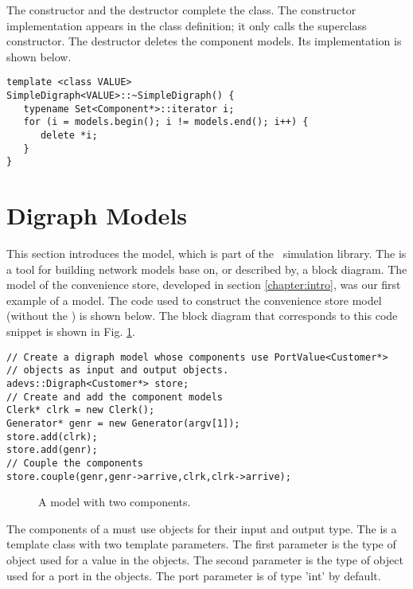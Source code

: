 The constructor and the destructor complete the class. The constructor implementation appears in the class definition; it only calls the superclass constructor. The destructor deletes the component models. Its implementation is shown below.
\begin{verbatim}
template <class VALUE>
SimpleDigraph<VALUE>::~SimpleDigraph() {
   typename Set<Component*>::iterator i;
   for (i = models.begin(); i != models.end(); i++) {
      delete *i;
   }
}
\end{verbatim}
 
\section{Digraph Models}
\label{section:digraph_models}
This section introduces the  model, which is part of the \adevs\ simulation library. The  is a tool for building network models base on, or described by, a block diagram. The model of the convenience store, developed in section \ref{chapter:intro}, was our first example of a  model. The code used to construct the convenience store model (without the ) is shown below. The block diagram that corresponds to this code snippet is shown in Fig. \ref{fig:two_component_diagram}.
\begin{verbatim}
// Create a digraph model whose components use PortValue<Customer*>
// objects as input and output objects.
adevs::Digraph<Customer*> store;
// Create and add the component models
Clerk* clrk = new Clerk();
Generator* genr = new Generator(argv[1]);
store.add(clrk);
store.add(genr);
// Couple the components
store.couple(genr,genr->arrive,clrk,clrk->arrive);
\end{verbatim}
\begin{figure}[ht]
\centering
{}
\caption{A  model with two components.}
\label{fig:two_component_diagram}
\end{figure}

The components of a  must use  objects for their input and output type.  The  is a template class with two template parameters. The first parameter is the type of object used for a value in the  objects. The second parameter is the type of object used for a port in the  objects. The port parameter is of type 'int' by default.

